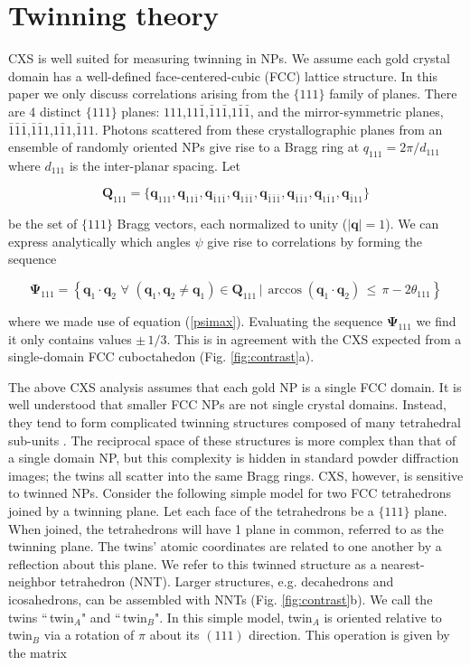 \documentclass [12pt,fleqn]{article}
\def \be {\begin{equation}}
\def \ee {\end{equation}}
\begin{document}
\section{Twinning theory}
CXS is well suited for measuring twinning in NPs. We assume each gold crystal domain has a well-defined face-centered-cubic (FCC) lattice structure. In this paper we only discuss correlations arising from the $\{111\}$ family of planes. There are 4 distinct $\{111\}$ planes: $111$,$11\bar 1$,$\bar 1 1\bar 1$,$1\bar 1 \bar 1$, and the mirror-symmetric planes, $\bar 1\bar 1\bar 1$,$\bar 1\bar 1 1$,$1 \bar 11$,$\bar 1 1 1$.  Photons scattered from these crystallographic planes from an ensemble of randomly oriented NPs give rise to a Bragg ring at  $q_{111} = 2\pi / d_{111} $ where $d_{111}$ is the inter-planar spacing. Let 

\be
\bm Q_{111} = \big \{\bm q_{111}, \bm q_{11\bar 1},\bm q_{\bar 1 1\bar 1},\bm q_{1\bar 1 \bar 1},\bm q_{\bar 1\bar 1\bar 1},\bm q_{\bar 1\bar 1 1},\bm q_{1 \bar 11},\bm q_{\bar 1 1 1} \big\}
\ee

be the set of $\{111\}$ Bragg vectors, each normalized to unity ($|\bm q| =1$). We can express analytically which angles $\psi$ give rise to correlations by forming the sequence

\be \label{psiset}
\bm {\Psi}_{111} = \left \{ \bm q_1\cdot \bm q_2 \, \,\forall \, \, (\bm q_1, \bm q_2 \ne \bm q_1) \in \bm Q_{111}\,  \big | \,  \arccos ( \bm q_1 \cdot \bm q_2 )   \, \le \,  \pi - 2\theta_{111}   \right \}
\ee 

where we made use of equation (\ref{psimax}). Evaluating the sequence $\bm {\Psi}_{111}$ we find it only contains values $\pm\, 1/3$. This is in agreement with the CXS expected from a single-domain FCC cuboctahedon (Fig. \ref{fig:contrast}a).

The above CXS analysis assumes that each gold NP is a single FCC domain. It is well understood that smaller FCC NPs are not single crystal domains. Instead, they tend to form complicated twinning structures composed of many tetrahedral sub-units \cite{marks1981high}. The reciprocal space of these structures is more complex than that of a single domain NP, but this complexity is hidden in standard powder diffraction images; the twins all scatter into the same Bragg rings. CXS, however, is sensitive to twinned NPs. Consider the following simple model for two FCC tetrahedrons joined by a twinning plane. Let each face of the tetrahedrons be a $\{111\}$ plane. When joined, the tetrahedrons will have 1 plane in common, referred to as the twinning plane. The twins' atomic coordinates are related to one another by a reflection about this plane. We refer to this twinned structure as a nearest-neighbor tetrahedron (NNT). Larger structures, e.g. decahedrons and icosahedrons, can be assembled with NNTs (Fig. \ref{fig:contrast}b). We call the twins ``\,twin$_A$" and ``\,twin$_B$".  In this simple model, twin$_A$ is oriented relative to twin$_B$ via a rotation of $\pi$ about its $(111)$ direction. This operation is given by the matrix
\end{document}
